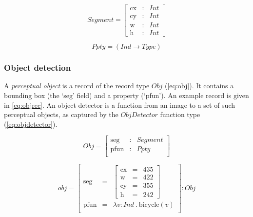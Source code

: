 \begin{equation}\label{eq:seg}
Segment = \left[\begin{array}{rcl}
\text{cx} &:& Int\\
\text{cy} &:& Int\\
\text{w} &:& Int\\
\text{h} &:& Int
\end{array}\right]\end{equation}

\begin{equation}\label{eq:ppty}
Ppty = (Ind \rightarrow Type)\end{equation}




\subsubsection{Object detection}

A \textit{perceptual object} is a record of the record type $Obj$ (\autoref{eq:obj}).
It contains a bounding box (the `seg' field) and a property (`pfun').
An example record is given in \autoref{eq:objrec}.
An object detector is a function from an image to a set of such perceptual objects, as captured by the $ObjDetector$ function type (\autoref{eq:objdetector}).


\begin{equation}\label{eq:obj}
Obj = \left[\begin{array}{rcl}
\text{seg} &:& Segment\\
\text{pfun} &:& Ppty \\
\end{array}\right]\end{equation}

\begin{equation}\label{eq:objrec}
obj =
\left[\begin{array}{rcl}
\text{seg} &=& \left[\begin{array}{rcl}
\text{cx} &=& 435\\
\text{w} &=& 422\\
\text{cy} &=& 355\\
\text{h} &=& 242
\end{array}\right]\\
\text{pfun} &=& \lambda v:Ind\ .\ \text{bicycle}(v)\\
\end{array}\right] : Obj\end{equation}

